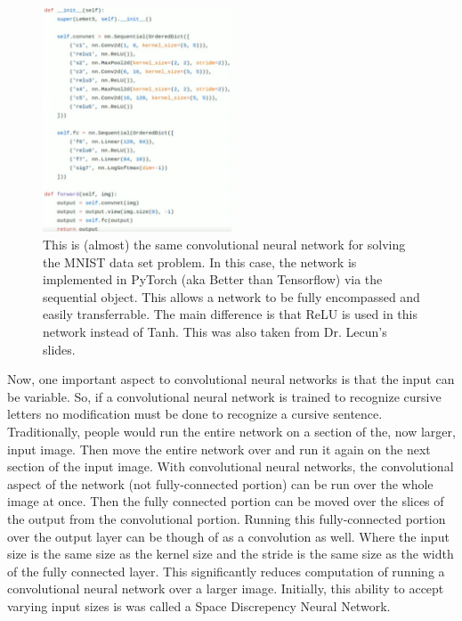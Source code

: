 \begin{figure}[ht]
  \centering
      \includegraphics[width=0.5\textwidth]{lectures/03-b/images/PyTorchCNNSeq.png}
          \caption{
            This is (almost) the same convolutional neural network for solving the MNIST data set problem.
            In this case, the network is implemented in PyTorch (aka Better than Tensorflow) via the sequential object.
            This allows a network to be fully encompassed and easily transferrable.
            The main difference is that ReLU is used in this network instead of Tanh.
            This was also taken from Dr. Lecun's slides.
          }
\end{figure}

Now, one important aspect to convolutional neural networks is that the input can be variable. 
So, if a convolutional neural network is trained to recognize cursive letters no modification must be done to recognize a cursive sentence.
Traditionally, people would run the entire network on a section of the, now larger, input image.
Then move the entire network over and run it again on the next section of the input image.
With convolutional neural networks, the convolutional aspect of the network (not fully-connected portion) can be run over the whole image at once.
Then the fully connected portion can be moved over the slices of the output from the convolutional portion.
Running this fully-connected portion over the output layer can be though of as a convolution as well.
Where the input size is the same size as the kernel size and the stride is the same size as the width of the fully connected layer.
This significantly reduces computation of running a convolutional neural network over a larger image.
Initially, this ability to accept varying input sizes is was called a Space Discrepency Neural Network.

